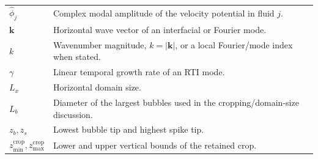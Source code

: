 \begin{longtable}{@{}p{}p{}@{}}
$\hat{\phi}_j$ & Complex modal amplitude of the velocity potential in fluid $j$. \\
$\mathbf{k}$ & Horizontal wave vector of an interfacial or Fourier mode. \\
$k$ & Wavenumber magnitude, $k=|\mathbf{k}|$, or a local Fourier/mode index when stated. \\
$\gamma$ & Linear temporal growth rate of an RTI mode. \\
$L_x$ & Horizontal domain size. \\
$L_b$ & Diameter of the largest bubbles used in the cropping/domain-size discussion. \\
$z_b,z_s$ & Lowest bubble tip and highest spike tip. \\
$z_{\min}^{\mathrm{crop}},z_{\max}^{\mathrm{crop}}$ & Lower and upper vertical bounds of the retained crop. \\


\end{longtable}
